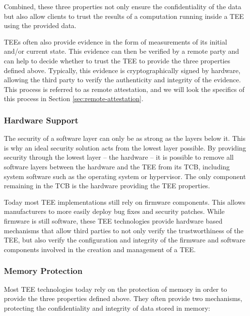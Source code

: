 Combined, these three properties not only ensure the confidentiality of the data
but also allow clients to trust the results of a computation running inside a
TEE using the provided data.

TEEs often also provide evidence in the form of measurements of its initial
and/or current state. This evidence can then be verified by a remote party and
can help to decide whether to trust the TEE to provide the three properties
defined above. Typically, this evidence is cryptographically signed by hardware,
allowing the third party to verify the authenticity and integrity of the
evidence. This process is referred to as remote attestation, and we will look
the specifics of this process in Section \ref{sec:remote-attestation}.

\subsubsection{Hardware Support}

The security of a software layer can only be as strong as the layers below it.
This is why an ideal security solution acts from the lowest layer possible. By
providing security through the lowest layer -- the hardware -- it is possible to
remove all software layers between the hardware and the TEE from its TCB,
including system software such as the operating system or hypervisor. The only
component remaining in the TCB is the hardware providing the TEE properties.

Today most TEE implementations still rely on firmware components. This allows
manufacturers to more easily deploy bug fixes and security patches. While
firmware is still software, these TEE technologies provide hardware based
mechanisms that allow third parties to not only verify the trustworthiness of
the TEE, but also verify the configuration and integrity of the firmware and
software components involved in the creation and management of a TEE.

\subsubsection{Memory Protection}

Most TEE technologies today rely on the protection of memory in order to provide
the three properties defined above. They often provide two mechanisms,
protecting the confidentiality and integrity of data stored in memory:

